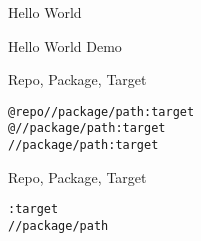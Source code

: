 \documentclass[aspectratio=169]{beamer}
\begin{document}
\begin{frame}{Hello World}
    \begin{center}\begin{Huge}Hello World Demo\end{Huge}\end{center}
\end{frame}

\begin{frame}{Repo, Package, Target}
\begin{center}
\huge{\texttt{@repo//package/path:target}} \\
\huge{\texttt{@//package/path:target}} \\
\huge{\texttt{//package/path:target}}
\end{center}
\end{frame}

\begin{frame}{Repo, Package, Target}
\begin{center}
\huge{\texttt{:target}} \\
\huge{\texttt{//package/path}}
\end{center}
\end{frame}
\end{document}
